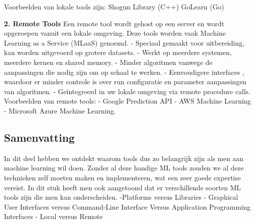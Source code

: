 Voorbeelden van lokale tools zijn:  \newline
Shogun Library (C++) \newline
GoLearn (Go) \newline

\textbf{2. Remote Tools} \newline
Een remote tool wordt gehost op een server en wordt opgeroepen vanuit een lokale omgeving. Deze tools worden vaak Machine Learning as a Service (MLaaS) genoemd. \newline
- Speciaal gemaakt voor uitbereiding, kan worden uitgevoerd op grotere datasets. \newline
- Werkt op meerdere systemen, meerdere kernen en shared memory. \newline
- Minder algoritmen vanwege de aanpassingen die nodig zijn om op schaal te werken. \newline
- Eenvoudigere interfaces , waardoor er minder controle is over run configuratie en parameter aanpassingen van algoritmen. \newline
- Geïntegreerd in uw lokale omgeving via remote procedure calls. \newline
Voorbeelden van remote tools: \newline
- Google Prediction API \newline
- AWS Machine Learning \newline
- Microsoft Azure Machine Learning.


\subsection{Samenvatting}
In dit deel hebben we ontdekt waarom tools dus zo belangrijk zijn als men aan machine learning wil doen. Zonder al deze handige ML tools zouden we al deze technieken zelf moeten maken en implementeren, wat een zeer goede expertise vereist. In dit stuk heeft men ook aangetoond dat er verschillende soorten ML tools zijn die men kan onderscheiden.\newline
-Platforms versus Libraries \newline
- Graphical User Interfaces versus Command-Line Interface Versus Application Programming Interfaces \newline
- Local versus Remote 

